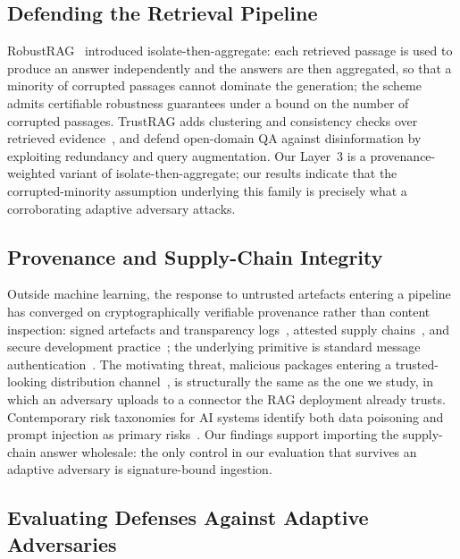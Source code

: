 \documentclass[information,article,submit,moreauthors]{Definitions/mdpi}
\begin{document}
\subsection{Defending the Retrieval Pipeline}

RobustRAG~\citep{xiang2024robustrag} introduced isolate-then-aggregate: each retrieved passage
is used to produce an answer independently and the answers are then aggregated, so that a
minority of corrupted passages cannot dominate the generation; the scheme admits certifiable
robustness guarantees under a bound on the number of corrupted passages. TrustRAG adds
clustering and consistency checks over retrieved evidence~\citep{zhou2025trustrag}, and
\citet{weller2024defending} defend open-domain QA against disinformation by exploiting
redundancy and query augmentation. Our Layer~3 is a provenance-weighted variant of
isolate-then-aggregate; our results indicate that the corrupted-minority assumption underlying
this family is precisely what a corroborating adaptive adversary attacks.

\subsection{Provenance and Supply-Chain Integrity}

Outside machine learning, the response to untrusted artefacts entering a pipeline has converged
on cryptographically verifiable provenance rather than content inspection: signed artefacts and
transparency logs~\citep{newman2022sigstore}, attested supply
chains~\citep{torresarias2019intoto}, and secure development
practice~\citep{nist2022ssdf}; the underlying primitive is standard message
authentication~\citep{krawczyk1997hmac}. The motivating threat, malicious packages entering a
trusted-looking distribution channel~\citep{ohm2020backstabber}, is structurally the same as
the one we study, in which an adversary uploads to a connector the RAG deployment already
trusts. Contemporary risk taxonomies for AI systems identify both data poisoning and prompt
injection as primary risks~\citep{vassilev2024nistaml,owasp2025llm}. Our findings support
importing the supply-chain answer wholesale: the only control in our evaluation that survives
an adaptive adversary is signature-bound ingestion.

\subsection{Evaluating Defenses Against Adaptive Adversaries}
\end{document}
